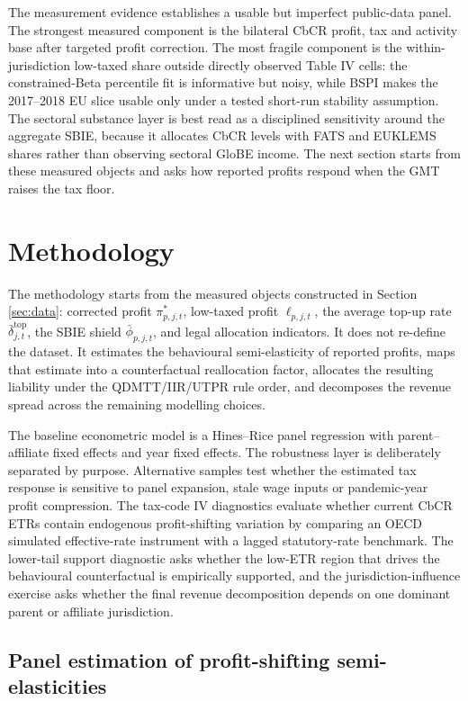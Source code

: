 \documentclass[11pt,a4paper]{article}
\begin{document}
The measurement evidence establishes a usable but imperfect public-data panel. The strongest measured component is the bilateral CbCR profit, tax and activity base after targeted profit correction. The most fragile component is the within-jurisdiction low-taxed share outside directly observed Table IV cells: the constrained-Beta percentile fit is informative but noisy, while BSPI makes the 2017--2018 EU slice usable only under a tested short-run stability assumption. The sectoral substance layer is best read as a disciplined sensitivity around the aggregate SBIE, because it allocates CbCR levels with FATS and EUKLEMS shares rather than observing sectoral GloBE income. The next section starts from these measured objects and asks how reported profits respond when the GMT raises the tax floor.

\newpage
\section{Methodology}\label{sec:methodology}

The methodology starts from the measured objects constructed in Section \ref{sec:data}: corrected profit $\pi^{*}_{p,j,t}$, low-taxed profit $\ell_{p,j,t}$, the average top-up rate $\bar{\delta}_{j,t}^{\text{top}}$, the SBIE shield $\bar{\phi}_{p,j,t}$, and legal allocation indicators. It does not re-define the dataset. It estimates the behavioural semi-elasticity of reported profits, maps that estimate into a counterfactual reallocation factor, allocates the resulting liability under the QDMTT/IIR/UTPR rule order, and decomposes the revenue spread across the remaining modelling choices.

The baseline econometric model is a Hines--Rice panel regression with parent--affiliate fixed effects and year fixed effects. The robustness layer is deliberately separated by purpose. Alternative samples test whether the estimated tax response is sensitive to panel expansion, stale wage inputs or pandemic-year profit compression. The tax-code IV diagnostics evaluate whether current CbCR ETRs contain endogenous profit-shifting variation by comparing an OECD simulated effective-rate instrument with a lagged statutory-rate benchmark. The lower-tail support diagnostic asks whether the low-ETR region that drives the behavioural counterfactual is empirically supported, and the jurisdiction-influence exercise asks whether the final revenue decomposition depends on one dominant parent or affiliate jurisdiction.

\subsection{Panel estimation of profit-shifting semi-elasticities}\label{sec:estimation}
\end{document}
